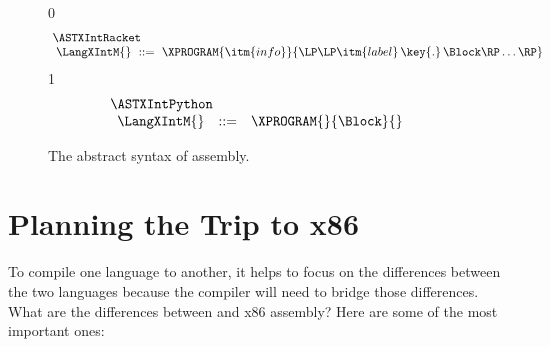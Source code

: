 \documentclass[7x10]{TimesAPriori_MIT}%
\def\racketEd{0}
\def\pythonEd{1}
\providecommand{\BookEdition}{1}
\let\edition\BookEdition
\newcommand{\pythonColor}[0]{}
\numberwithin{theorem}{chapter}
\numberwithin{definition}{chapter}
\numberwithin{equation}{chapter}
\begin{document}
\begin{figure}[tp]
\begin{tcolorbox}[colback=white]
\small
{\if\edition\racketEd
\[\arraycolsep=3pt
\begin{array}{l}
  \ASTXIntRacket \\
\begin{array}{lcl}
\LangXIntM{} &::= & \XPROGRAM{\itm{info}}{\LP\LP\itm{label} \,\key{.}\, \Block \RP\ldots\RP}
\end{array}
\end{array}
\]
\fi}
{\if\edition\pythonEd\pythonColor
\[
\begin{array}{l}
 \ASTXIntPython \\
\begin{array}{lcl}
\LangXIntM{} &::= & \XPROGRAM{}{\Block}{}
\end{array}
\end{array}
\]
\fi}
\end{tcolorbox}
\caption{The abstract syntax of \LangXInt{} assembly.}
\label{fig:x86-int-ast}
\end{figure}

\section{Planning the Trip to x86}
\label{sec:plan-s0-x86}

To compile one language to another, it helps to focus on the
differences between the two languages because the compiler will need
to bridge those differences. What are the differences between \LangVar{}
and x86 assembly? Here are some of the most important ones:
\end{document}
